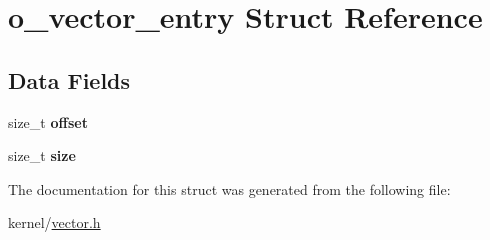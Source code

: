 \hypertarget{structo__vector__entry}{\section{o\-\_\-vector\-\_\-entry Struct Reference}
\label{structo__vector__entry}
}
\subsection*{Data Fields}
\begin{DoxyCompactItemize}
\item 
\hypertarget{structo__vector__entry_a75a7e43d120adedd6e6ccc1d70ecaf91}{size\-\_\-t {\bfseries offset}}\label{structo__vector__entry_a75a7e43d120adedd6e6ccc1d70ecaf91}

\item 
\hypertarget{structo__vector__entry_aa418fbf2005a89c01cf66aa87dcf511d}{size\-\_\-t {\bfseries size}}\label{structo__vector__entry_aa418fbf2005a89c01cf66aa87dcf511d}

\end{DoxyCompactItemize}


The documentation for this struct was generated from the following file\-:\begin{DoxyCompactItemize}
\item 
kernel/\hyperlink{vector_8h}{vector.\-h}\end{DoxyCompactItemize}
